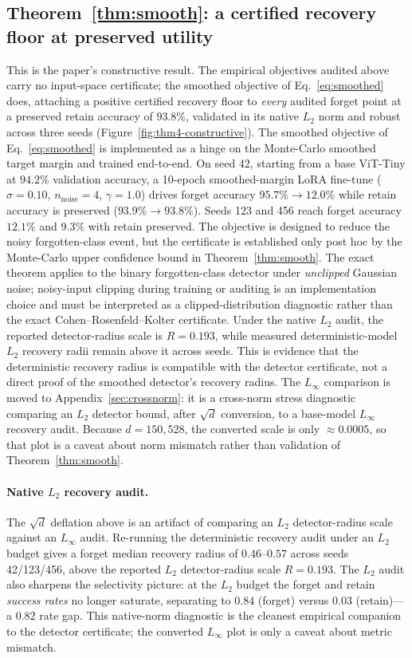 \documentclass{article}
\begin{document}
\subsection{Theorem~\ref{thm:smooth}: a certified recovery floor at preserved utility}
This is the paper's constructive result. The empirical objectives audited above carry no input-space certificate; the smoothed objective of Eq.~\eqref{eq:smoothed} does, attaching a positive certified recovery floor to \emph{every} audited forget point at a preserved retain accuracy of $93.8\%$, validated in its native $L_2$ norm and robust across three seeds (Figure~\ref{fig:thm4-constructive}). The smoothed objective of Eq.~\eqref{eq:smoothed} is implemented as a hinge on the Monte-Carlo smoothed target margin and trained end-to-end. On seed 42, starting from a base ViT-Tiny at $94.2\%$ validation accuracy, a 10-epoch smoothed-margin LoRA fine-tune ($\sigma = 0.10$, $n_{\text{noise}} = 4$, $\gamma = 1.0$) drives forget accuracy $95.7\% \to 12.0\%$ while retain accuracy is preserved ($93.9\% \to 93.8\%$). Seeds 123 and 456 reach forget accuracy $12.1\%$ and $9.3\%$ with retain preserved. The objective is designed to reduce the noisy forgotten-class event, but the certificate is established only post hoc by the Monte-Carlo upper confidence bound in Theorem~\ref{thm:smooth}. The exact theorem applies to the binary forgotten-class detector under \emph{unclipped} Gaussian noise; noisy-input clipping during training or auditing is an implementation choice and must be interpreted as a clipped-distribution diagnostic rather than the exact Cohen--Rosenfeld--Kolter certificate. Under the native $L_2$ audit, the reported detector-radius scale is $R=0.193$, while measured deterministic-model $L_2$ recovery radii remain above it across seeds. This is evidence that the deterministic recovery radius is compatible with the detector certificate, not a direct proof of the smoothed detector's recovery radius. The $L_\infty$ comparison is moved to Appendix~\ref{sec:crossnorm}: it is a cross-norm stress diagnostic comparing an $L_2$ detector bound, after $\sqrt{d}$ conversion, to a base-model $L_\infty$ recovery audit. Because $d=150{,}528$, the converted scale is only $\approx0.0005$, so that plot is a caveat about norm mismatch rather than validation of Theorem~\ref{thm:smooth}.

\paragraph{Native $L_2$ recovery audit.} The $\sqrt{d}$ deflation above is an artifact of comparing an $L_2$ detector-radius scale against an $L_\infty$ audit. Re-running the deterministic recovery audit under an $L_2$ budget gives a forget median recovery radius of $0.46$--$0.57$ across seeds 42/123/456, above the reported $L_2$ detector-radius scale $R = 0.193$. The $L_2$ audit also sharpens the selectivity picture: at the $L_2$ budget the forget and retain \emph{success rates} no longer saturate, separating to $0.84$ (forget) versus $0.03$ (retain)---a $0.82$ rate gap. This native-norm diagnostic is the cleanest empirical companion to the detector certificate; the converted $L_\infty$ plot is only a caveat about metric mismatch.
\end{document}
